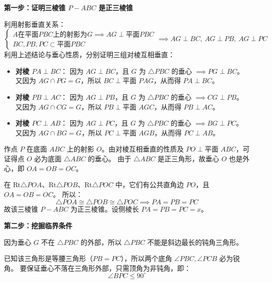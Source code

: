 \documentclass[11pt,a4paper]{ctexart}
\begin{document}
\vspace{0.5cm}
\begin{proof*}
\textbf{第一步：证明三棱锥 $P-ABC$ 是正三棱锥}\par
利用射影垂直关系：
\[
\begin{cases}
A \text{在平面} PBC \text{上的射影为} G \implies AG \perp \text{平面} PBC \\
BC, PB, PC \subset \text{平面} PBC
\end{cases}
\implies
AG \perp BC,\ AG \perp PB,\ AG \perp PC
\]
利用上述结论与垂心性质，分别证明三组对棱互相垂直：
\begin{itemize}
    \item \textbf{对棱 $PA \perp BC$}：
    因为 $AG \perp BC$，且 $G$ 为 $\triangle PBC$ 的垂心 $\implies PG \perp BC$。
    又因为 $AG \cap PG = G$，所以 $BC \perp \text{平面 } PAG$，从而得 $PA \perp BC$。
    \item \textbf{对棱 $PB \perp AC$}：
    因为 $AG \perp PB$，且 $G$ 为 $\triangle PBC$ 的垂心 $\implies CG \perp PB$。
    又因为 $AG \cap CG = G$，所以 $PB \perp \text{平面 } AGC$，从而得 $PB \perp AC$。
    \item \textbf{对棱 $PC \perp AB$}：
    因为 $AG \perp PC$，且 $G$ 为 $\triangle PBC$ 的垂心 $\implies BG \perp PC$。
    又因为 $AG \cap BG = G$，所以 $PC \perp \text{平面 } AGB$，从而得 $PC \perp AB$。
\end{itemize}
作点 $P$ 在底面 $ABC$ 上的射影 $O$。由对棱互相垂直的性质及 $PO \perp \text{平面 } ABC$，可证得点 $O$ 必为底面 $\triangle ABC$ 的垂心。
由于 $\triangle ABC$ 是正三角形，故垂心 $O$ 也是外心，即 $OA = OB = OC$。\par
在 Rt$\triangle POA$、Rt$\triangle POB$、Rt$\triangle POC$ 中，它们有公共直角边 $PO$，且 $OA=OB=OC$。
所以：
\[ \triangle POA \cong \triangle POB \cong \triangle POC \implies PA = PB = PC \]
故该三棱锥 $P-ABC$ 为正三棱锥。设侧棱长 $PA = PB = PC = x$。

\vspace{0.3cm}
\textbf{第二步：挖掘临界条件}\par
因为垂心 $G$ 不在 $\triangle PBC$ 的外部，所以 $\triangle PBC$ 不能是斜边最长的钝角三角形。\par
已知该三角形是等腰三角形（$PB = PC$），所以两个底角 $\angle PBC, \angle PCB$ 必为锐角。
要保证垂心不落在三角形外部，只需顶角为非钝角，即：
\[ \angle BPC \le 90^\circ \]


\end{proof*}
\end{document}
